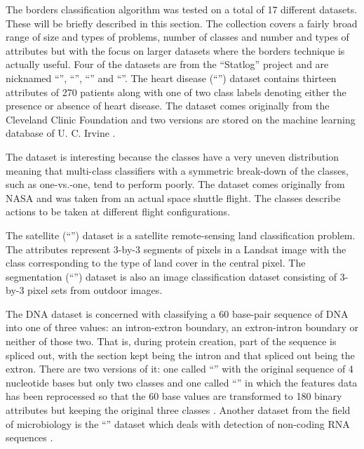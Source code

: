 The borders classification algorithm was tested on a total of 
17 different datasets.
These will be briefly described in this section.
The collection covers a fairly broad range of size and types of problems, 
number of classes and number and types of attributes but with
the focus on larger datasets where the borders technique is actually useful.
Four of the datasets are from
the ``Statlog'' project \citep{Michie_etal1994,King_etal1995} 
and are nicknamed ``'', ``'', ``'' and ``''.
The heart disease (``'') dataset 
contains thirteen attributes of 270 patients along with one of two class labels denoting either the presence or absence of heart disease.
The dataset comes originally from the Cleveland Clinic Foundation and two versions are stored on the machine learning database of U. C. Irvine \citep{Lichman2013}.

The  dataset is interesting because 
the classes have a very uneven distribution meaning that multi-class
classifiers
with a symmetric break-down of the classes, 
such as one-vs.-one,
tend to perform poorly.
The  dataset comes originally
from NASA and was taken from an actual space shuttle flight.
The classes describe actions to be taken at different flight configurations.

The satellite (``'') dataset is a satellite remote-sensing land classification problem.
The attributes represent 3-by-3 segments of pixels in a Landsat 
image with the class corresponding to the type of land cover in the central pixel.
The segmentation (``'') dataset is also an image classification dataset consisting of 3-by-3
pixel sets from outdoor images.

The DNA dataset is concerned with classifying a 60 base-pair sequence of DNA into
one of three values: an intron-extron boundary, an extron-intron boundary or
neither of those two.
That is, during protein creation, part of the sequence is spliced out, with
the section kept being the intron and that spliced out being the extron.
There are two versions of it: one called ``'' with the original 
sequence of 4 nucleotide bases but only two classes 
and one called ``'' in which
the features data has been reprocessed so that
the 60 base values are transformed to 180 binary attributes but keeping the
original three classes \citep{Michie_etal1994}.
Another dataset from the field of microbiology is the ``'' dataset
which deals with detection of non-coding RNA sequences
\citep{Uzilov_etal2006}.

